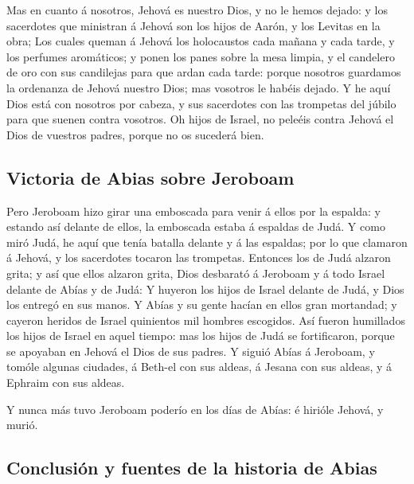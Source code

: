  Mas en cuanto á nosotros, Jehová es nuestro Dios, y no le
hemos dejado: y los sacerdotes que ministran á Jehová son los hijos de
Aarón, y los Levitas en la obra;  Los cuales queman á
Jehová los holocaustos cada mañana y cada tarde, y los perfumes
aromáticos; y ponen los panes sobre la mesa limpia, y el candelero de
oro con sus candilejas para que ardan cada tarde: porque nosotros
guardamos la ordenanza de Jehová nuestro Dios; mas vosotros le habéis
dejado.  Y he aquí Dios está con nosotros por cabeza, y sus
sacerdotes con las trompetas del júbilo para que suenen contra vosotros.
Oh hijos de Israel, no peleéis contra Jehová el Dios de vuestros padres,
porque no os sucederá bien.

\hypertarget{victoria-de-abias-sobre-jeroboam}{%
\subsection{Victoria de Abias sobre
Jeroboam}\label{victoria-de-abias-sobre-jeroboam}}

 Pero Jeroboam hizo girar una emboscada para venir á ellos
por la espalda: y estando así delante de ellos, la emboscada estaba á
espaldas de Judá.  Y como miró Judá, he aquí que tenía
batalla delante y á las espaldas; por lo que clamaron á Jehová, y los
sacerdotes tocaron las trompetas.  Entonces los de Judá
alzaron grita; y así que ellos alzaron grita, Dios desbarató á Jeroboam
y á todo Israel delante de Abías y de Judá:  Y huyeron los
hijos de Israel delante de Judá, y Dios los entregó en sus manos.
 Y Abías y su gente hacían en ellos gran mortandad; y
cayeron heridos de Israel quinientos mil hombres escogidos.
 Así fueron humillados los hijos de Israel en aquel tiempo:
mas los hijos de Judá se fortificaron, porque se apoyaban en Jehová el
Dios de sus padres.  Y siguió Abías á Jeroboam, y tomóle
algunas ciudades, á Beth-el con sus aldeas, á Jesana con sus aldeas, y á
Ephraim con sus aldeas.

 Y nunca más tuvo Jeroboam poderío en los días de Abías: é
hirióle Jehová, y murió.

\hypertarget{conclusiuxf3n-y-fuentes-de-la-historia-de-abias}{%
\subsection{Conclusión y fuentes de la historia de
Abias}\label{conclusiuxf3n-y-fuentes-de-la-historia-de-abias}}

